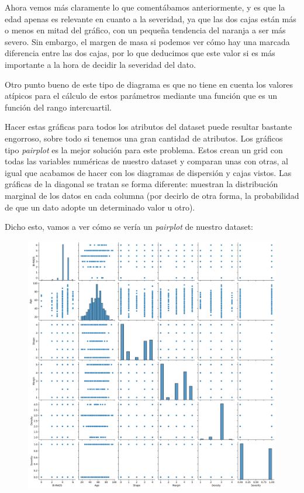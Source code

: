 \documentclass[11pt,a4paper]{article}
\begin{document}
Ahora vemos más claramente lo que comentábamos anteriormente, y es que la edad apenas es relevante en cuanto a la severidad, ya que
las dos cajas están más o menos en mitad del gráfico, con un pequeña tendencia del naranja a ser más severo. Sin embargo, el margen
de masa si podemos ver cómo hay una marcada diferencia entre las dos cajas, por lo que deducimos que este valor si es más importante
a la hora de decidir la severidad del dato.

Otro punto bueno de este tipo de diagrama es que no tiene en cuenta los valores atípicos para el cálculo de estos parámetros mediante
una función que es un función del rango intercuartil.

\newpage
Hacer estas gráficas para todos los atributos del dataset puede resultar bastante engorroso, sobre todo si tenemos una gran cantidad
de atributos. Los gráficos tipo \textit{pairplot} es la mejor solución para este problema. Estos crean un grid con todas las variables
numéricas de nuestro dataset y comparan unas con otras, al igual que acabamos de hacer con los diagramas de dispersión y cajas vistos.
Las gráficas de la diagonal se tratan se forma diferente: muestran la distribución marginal de los datos en cada columna (por decirlo
de otra forma, la probabilidad de que un dato adopte un determinado valor u otro).

Dicho esto, vamos a ver cómo se vería un \textit{pairplot} de nuestro dataset:

\begin{figure}[H]
    \centering
    \includegraphics[scale=0.25]{img/pairplot.png}
\end{figure}
\end{document}
